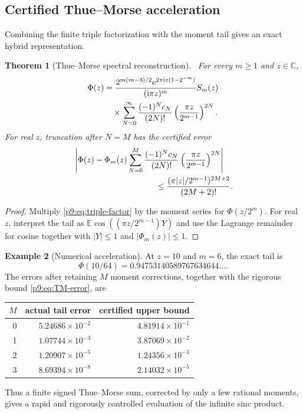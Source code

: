 \documentclass[11pt]{article}
\numberwithin{equation}{section}
\newtheorem{theorem}{Theorem}[section]
\theoremstyle{definition}
\newtheorem{example}[theorem]{Example}
\theoremstyle{remark}
\newcommand{\C}{\mathbb C}
\newcommand{\E}{\mathbb E}
\newcommand{\e}{\mathrm e}
\newcommand{\ii}{\mathrm i}
\begin{document}
\subsection{Certified Thue--Morse acceleration}
Combining the finite triple factorization with the moment tail gives an exact hybrid
representation.

\begin{theorem}[Thue--Morse spectral reconstruction]\label{p9:thm:TM-reconstruction}
\statusN\ For every $m\ge1$ and $z\in\C$,
\begin{align}
 \Phi(z)
 &=\frac{2^{m(m-3)/2}\e^{2\pi\ii z(1-2^{-m})}}{(\ii\pi z)^m}
 S_m(z)                                                     \notag\\
 &\quad\times
 \sum_{N=0}^{\infty}\frac{(-1)^Nc_N}{(2N)!}
 \left(\frac{\pi z}{2^{m-1}}\right)^{2N}.                 \label{p9:eq:TM-reconstruction}
\end{align}
For real $z$, truncation after $N=M$ has the certified error
\begin{align}
 &\left|\Phi(z)-\Phi_m(z)
 \sum_{N=0}^{M}\frac{(-1)^Nc_N}{(2N)!}
 \left(\frac{\pi z}{2^{m-1}}\right)^{2N}\right|           \notag\\
 &\hspace{35mm}\le
 \frac{(\pi|z|/2^{m-1})^{2M+2}}{(2M+2)!}.                 \label{p9:eq:TM-error}
\end{align}
\end{theorem}

\begin{proof}
Multiply \eqref{p9:eq:triple-factor} by the moment series for
$\Phi(z/2^m)$.  For real $z$, interpret the tail as
$\E\cos((\pi z/2^{m-1})Y)$ and use the Lagrange remainder for cosine together with
$|Y|\le1$ and $|\Phi_m(z)|\le1$.
\end{proof}

\begin{example}[Numerical acceleration]
At $z=10$ and $m=6$, the exact tail is
\[
\Phi(10/64)=0.94753140589767634644\ldots.
\]
The errors after retaining $M$ moment
corrections, together with the rigorous bound \eqref{p9:eq:TM-error}, are
\begin{center}
\begin{tabular}{@{}rrr@{}}
\toprule
$M$ & actual tail error & certified upper bound\\
\midrule
0 & $5.24686\times10^{-2}$ & $4.81914\times10^{-1}$\\
1 & $1.07744\times10^{-3}$ & $3.87069\times10^{-2}$\\
2 & $1.20907\times10^{-5}$ & $1.24356\times10^{-3}$\\
3 & $8.69394\times10^{-8}$ & $2.14032\times10^{-5}$\\
\bottomrule
\end{tabular}
\end{center}
Thus a finite signed Thue--Morse sum, corrected by only a few rational moments, gives a
rapid and rigorously controlled evaluation of the infinite sinc product.
\end{example}
\end{document}
